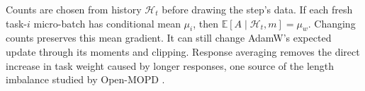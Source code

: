 Counts are chosen from history $\mathcal H_t$ before drawing the step's
data. If each fresh task-$i$ micro-batch has conditional mean $\mu_i$,
then $\mathbb E[A\mid\mathcal H_t,m]=\mu_w$. Changing counts preserves
this mean gradient. It can still change AdamW's expected update through
its moments and clipping. Response averaging removes the direct increase
in task weight caused by longer responses, one source of the length
imbalance studied by Open-MOPD
\citep{gao2026openmopddiagnosingfixingcapability}.
